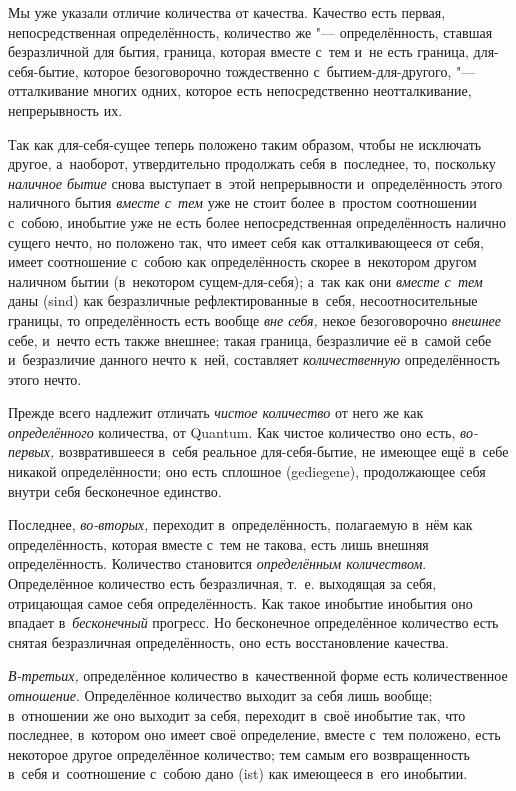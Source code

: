Мы уже указали отличие количества от качества. Качество есть первая,
непосредственная определённость, количество же "--- определённость, ставшая
безразличной для бытия, граница, которая вместе с~тем и~не есть граница,
для-себя-бытие, которое безоговорочно тождественно с~бытием-для-другого,
"--- отталкивание многих одних, которое есть непосредственно
неотталкивание, непрерывность их.

Так как для-себя-сущее теперь положено таким образом, чтобы не исключать
другое, а~наоборот, утвердительно продолжать себя в~последнее, то, поскольку
{\em наличное бытие} снова выступает в~этой непрерывности и~определённость
этого наличного бытия {\em вместе с~тем} уже не стоит более в~простом
соотношении с~собою, инобытие уже не есть более непосредственная определённость
налично сущего нечто, но положено так, что имеет себя как отталкивающееся от
себя, имеет соотношение с~собою как определённость скорее в~некотором другом
наличном бытии (в~некотором сущем-для-себя); а~так как они {\em вместе с~тем}
даны (sind) как безразличные рефлектированные в~себя, несоотносительные
границы, то определённость есть вообще {\em вне себя,} некое безоговорочно
{\em внешнее} себе, и~нечто есть также внешнее; такая граница, безразличие её
в~самой себе и~безразличие данного нечто к~ней, составляет {\em количественную}
определённость этого нечто.

Прежде всего надлежит отличать {\em чистое количество} от него же как
{\em определённого} количества, от Quantum. Как чистое количество оно есть,
{\em во-первых,} возвратившееся в~себя реальное для-себя-бытие, не имеющее ещё
в~себе никакой определённости; оно есть сплошное (gediegene), продолжающее себя
внутри себя бесконечное единство.

Последнее, {\em во-вторых,} переходит в~определённость, полагаемую в~нём как
определённость, которая вместе с~тем не такова, есть лишь внешняя
определённость. Количество становится {\em определённым количеством}.
Определённое количество есть безразличная, т.~е. выходящая за себя, отрицающая
самое себя определённость. Как такое инобытие инобытия оно впадает
в~{\em бесконечный} прогресс. Но бесконечное определённое количество есть
снятая безразличная определённость, оно есть восстановление качества.

{\em В-третьих,} определённое количество в~качественной форме есть
количественное {\em отношение}. Определённое количество выходит за себя лишь
вообще; в~отношении же оно выходит за себя, переходит в~своё инобытие так, что
последнее, в~котором оно имеет своё определение, вместе с~тем положено, есть
некоторое другое определённое количество; тем самым его возвращенность в~себя
и~соотношение с~собою дано (ist) как имеющееся в~его инобытии.

